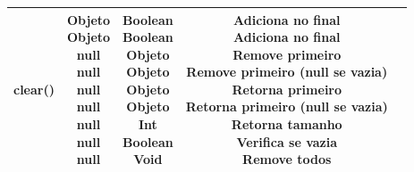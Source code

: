 \documentclass[a4paper,10pt]{article}
\begin{document}
\begin{center}
\begin{longtable}{ |l|c|c|c|c| }
\\ clear()} & \makecell{Objeto \\ Objeto \\ null \\ null \\ null \\ null \\ null \\ null \\ null} & \makecell{Boolean \\ Boolean \\ Objeto \\ Objeto \\ Objeto \\ Objeto \\ Int \\ Boolean \\ Void} & \makecell{Adiciona no final \\ Adiciona no final \\ Remove primeiro \\ Remove primeiro (null se vazia) \\ Retorna primeiro \\ Retorna primeiro (null se vazia) \\ Retorna tamanho \\ Verifica se vazia \\ Remove todos} \\ \hline


\end{longtable}
\end{center}
\end{document}
